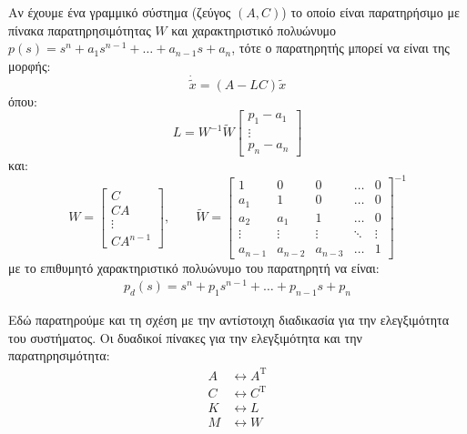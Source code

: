 \documentclass[11pt,a4paper,notitlepage,fleqn]{article}
\begin{document}
\begin{theorem}{}{}
	Αν έχουμε ένα γραμμικό σύστημα (ζεύγος \( (A,C) \)) το οποίο είναι
	παρατηρήσιμο με πίνακα παρατηρησιμότητας \( W \) και χαρακτηριστικό
	πολυώνυμο \( p(s) = s^n + a_1s^{n-1} + \dots + a_{n-1}s + a_n \),
	τότε ο παρατηρητής μπορεί να είναι της μορφής:
	\[
	\boxed{\dot{\tilde x} = (A-LC)\tilde x}
	\]
	όπου:
	\[
	L = W^{-1}\tilde W \left[\begin{matrix}
	p_1 - a_1 \\ \vdots \\ p_n - a_n
	\end{matrix}\right]
	\]
	και:
	\[
	W = \left[\begin{matrix}
	C \\ CA \\ \vdots \\ CA^{n-1}
	\end{matrix}\right],\qquad \tilde W = \left[\begin{matrix}
	1 & 0 & 0 & \hdots & 0\\
	a_1 & 1 & 0 & \hdots & 0\\
	a_2 & a_1 & 1 & \hdots & 0\\
	\vdots & \vdots & \vdots & \ddots & \vdots \\
	a_{n-1} & a_{n-2} & a_{n-3} & \hdots & 1
	\end{matrix}\right]^{-1}
	\]
	με το επιθυμητό χαρακτηριστικό πολυώνυμο του παρατηρητή να είναι:
	\begin{gather*}
		p_d(s) = s^n + p_1s^{n-1} + \dots + p_{n-1}s+p_n
	\end{gather*}
\end{theorem}

Εδώ παρατηρούμε και τη σχέση με την αντίστοιχη διαδικασία για την ελεγξιμότητα του συστήματος. Οι δυαδικοί πίνακες για την ελεγξιμότητα και
την παρατηρησιμότητα:
\[
\boxed{\begin{aligned}
	A &\leftrightarrow A^{\mathrm T} \\
	C &\leftrightarrow C^{\mathrm T} \\
	K &\leftrightarrow L \\
	M &\leftrightarrow W
	\end{aligned}}
\]
\end{document}
